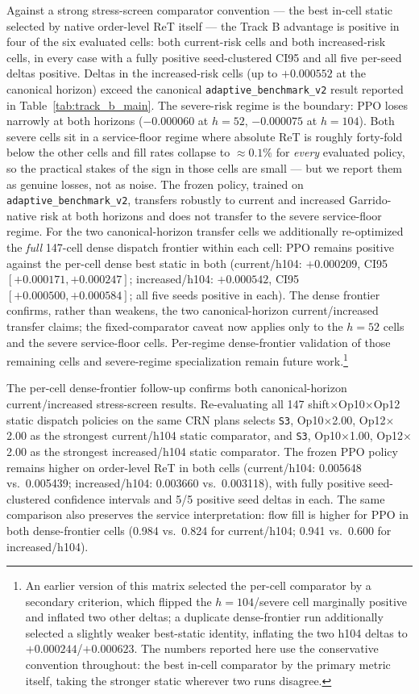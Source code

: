 Against a strong stress-screen comparator convention --- the best in-cell
static selected by native order-level ReT itself --- the Track B advantage is
positive in four of the six evaluated cells: both current-risk cells and
both increased-risk cells, in every case with a fully positive
seed-clustered CI95 and all five per-seed deltas positive. Deltas in the
increased-risk cells (up to $+0.000552$ at the canonical horizon) exceed
the canonical \texttt{adaptive\_benchmark\_v2} result reported in
Table~\ref{tab:track_b_main}. The severe-risk regime is the boundary: PPO
loses narrowly at both horizons ($-0.000060$ at $h{=}52$, $-0.000075$ at
$h{=}104$). Both severe cells sit in a service-floor regime where
absolute ReT is roughly forty-fold below the other cells and fill rates
collapse to $\approx 0.1\%$ for \emph{every} evaluated policy, so the
practical stakes of the sign in those cells are small --- but we report
them as genuine losses, not as noise. The frozen policy, trained on
\texttt{adaptive\_benchmark\_v2}, transfers robustly to current and
increased Garrido-native risk at both horizons and does not transfer to
the severe service-floor regime. For the two canonical-horizon transfer
cells we additionally re-optimized the \emph{full} 147-cell dense
dispatch frontier within each cell: PPO remains positive against the
per-cell dense best static in both (current/h104: $+0.000209$, CI95
$[+0.000171, +0.000247]$; increased/h104: $+0.000542$, CI95
$[+0.000500, +0.000584]$; all five seeds positive in each). The dense
frontier confirms, rather than weakens, the two canonical-horizon
current/increased transfer claims; the fixed-comparator caveat now
applies only to the $h{=}52$ cells and the severe service-floor cells.
Per-regime dense-frontier validation of those remaining cells and
severe-regime specialization remain future
work.\footnote{An earlier version of this matrix selected the per-cell
comparator by a secondary criterion, which flipped the $h{=}104$/severe
cell marginally positive and inflated two other deltas; a duplicate
dense-frontier run additionally selected a slightly weaker best-static
identity, inflating the two h104 deltas to $+0.000244$/$+0.000623$. The
numbers reported here use the conservative convention throughout: the
best in-cell comparator by the primary metric itself, taking the
stronger static wherever two runs disagree.}

The per-cell dense-frontier follow-up confirms both canonical-horizon
current/increased stress-screen results. Re-evaluating all 147
shift$\times$Op10$\times$Op12 static dispatch policies on the same CRN
plans selects \texttt{S3}, Op10$\times$2.00, Op12$\times$2.00 as the
strongest current/h104 static comparator, and \texttt{S3},
Op10$\times$1.00, Op12$\times$2.00 as the strongest increased/h104
static comparator. The frozen PPO policy remains higher on order-level
ReT in both cells (current/h104: 0.005648 vs.\ 0.005439; increased/h104:
0.003660 vs.\ 0.003118), with fully positive seed-clustered confidence
intervals and 5/5 positive seed deltas in each. The same comparison also
preserves the service interpretation: flow fill is higher for PPO in
both dense-frontier cells (0.984 vs.\ 0.824 for current/h104; 0.941
vs.\ 0.600 for increased/h104).

